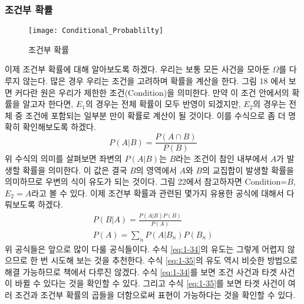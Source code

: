 \documentclass[a4paper]{oblivoir}
\begin{document}
\subsubsection{조건부 확률}
\begin{figure}[ht]\centering
\texttt{[image: Conditional\_Probablilty]}\caption{조건부 확률}\label{Fig:1-23}
\end{figure}
\indent 이제 조건부 확률에 대해 알아보도록 하겠다. 우리는 보통 모든 사건을 모아둔 $\Omega$를 다루지 않는다. 많은 경우 우리는 조건을 고려하며 확률을 계산을 한다. 
그림 18 에서 보면 커다란 원은 우리가 제한한 조건(Condition)을 의미한다. 만약 이 조건 안에서의 확률을 알고자 한다면, $E_1$의 경우는 전체 확률이 모두 반영이 되겠지만, $E_2$의 경우는 전체 중 조건에 포함되는 일부분 만이 확률로 계산이 될 것이다. 이를 수식으로 좀 더 명확히 확인해보도록 하겠다.
\begin{equation}
P(A|B)=\frac{P(A\cap B)}{P(B)}
\end{equation}
\indent 위 수식의 의미를 살펴보면 좌변의 $P(A|B)$는 $B$라는 조건이 참인 내부에서 $A$가 발생할 확률을 의미한다. 이 값은 결국 $B$의 영역에서 $A$와 $B$의 교집합이 발생할 확률을 의미하므로 우변의 식이 유도가 되는 것이다. 그림 22에서 참고하자면 Condition=$B$, $E_2=A$라고 볼 수 있다. 이제 조건부 확률과 관련된 몇가지 유용한 공식에 대해서 다뤄보도록 하겠다.
\begin{align}
P(B|A)=\frac{P(A|B)P(B)}{P(A)}\label{eq:1-34}\\
P(A)=\sum_{n} P(A|B_n)P(B_n)\label{eq:1-35}
\end{align}
\indent 위 공식들은 앞으로 많이 다룰 공식들이다. 수식 \eqref{eq:1-34}의 유도는 그렇게 어렵지 않으므로 한 번 시도해 보는 것을 추천한다. 수식 \eqref{eq:1-35}의 유도 역시 비슷한 방법으로 해결 가능하므로 책에서 다루진 않겠다. 수식 \eqref{eq:1-34}를 보면 조건 사건과 타겟 사건이 바뀔 수 있다는 것을 확인할 수 있다. 그리고 수식 \eqref{eq:1-35}를 보면 타겟 사건이 여러 조건과 조건부 확률의 곱들을 더함으로써 표현이 가능하다는 것을 확인할 수 있다. \\

\end{document}
